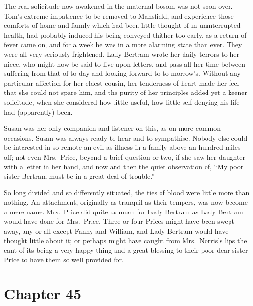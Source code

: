 The real solicitude now awakened in the maternal bosom
was not soon over.  Tom's extreme impatience to be
removed to Mansfield, and experience those comforts
of home and family which had been little thought of in
uninterrupted health, had probably induced his being
conveyed thither too early, as a return of fever came on,
and for a week he was in a more alarming state than ever.
They were all very seriously frightened.  Lady Bertram
wrote her daily terrors to her niece, who might now be said
to live upon letters, and pass all her time between suffering
from that of to-day and looking forward to to-morrow's.
Without any particular affection for her eldest cousin,
her tenderness of heart made her feel that she could
not spare him, and the purity of her principles added yet
a keener solicitude, when she considered how little useful,
how little self-denying his life had (apparently) been.

Susan was her only companion and listener on this, as on
more common occasions.  Susan was always ready to hear and
to sympathise.  Nobody else could be interested in so remote
an evil as illness in a family above an hundred miles off;
not even Mrs.\ Price, beyond a brief question or two,
if she saw her daughter with a letter in her hand,
and now and then the quiet observation of, ``My poor
sister Bertram must be in a great deal of trouble.''

So long divided and so differently situated, the ties
of blood were little more than nothing.  An attachment,
originally as tranquil as their tempers, was now become
a mere name.  Mrs.\ Price did quite as much for Lady
Bertram as Lady Bertram would have done for Mrs.\ Price.
Three or four Prices might have been swept away,
any or all except Fanny and William, and Lady Bertram
would have thought little about it; or perhaps might have
caught from Mrs.\ Norris's lips the cant of its being
a very happy thing and a great blessing to their poor
dear sister Price to have them so well provided for.



\chapter{Chapter 45}

